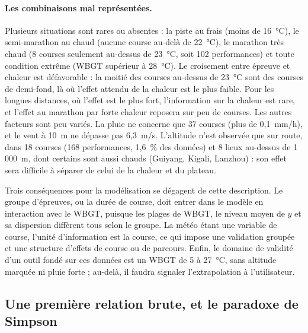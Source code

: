 \documentclass[11pt,a4paper]{article}
\begin{document}
\paragraph{Les combinaisons mal représentées.} Plusieurs situations sont rares ou absentes : la piste au frais (moins
de 16~°C), le semi-marathon au chaud (aucune course au-delà de 22~°C), le marathon très chaud (8 courses seulement
au-dessus de 23~°C, soit 102 performances) et toute condition extrême (WBGT supérieur à 28~°C). Le croisement entre
épreuve et chaleur est défavorable : la moitié des courses au-dessus de 23~°C sont des courses de demi-fond, là où
l'effet attendu de la chaleur est le plus faible. Pour les longues distances, où l'effet est le plus fort,
l'information sur la chaleur est rare, et l'effet au marathon par forte chaleur reposera sur peu de courses. Les
autres facteurs sont peu variés. La pluie ne concerne que 37 courses (plus de 0,1~mm/h), et le vent à 10~m ne dépasse
pas 6,3~m/s. L'altitude n'est observée que sur route, dans 18 courses (168 performances, 1,6~\% des données) et 8 lieux
au-dessus de 1\,000~m, dont certains sont aussi chauds (Guiyang, Kigali, Lanzhou) : son effet sera difficile à séparer
de celui de la chaleur et du plateau.

Trois conséquences pour la modélisation se dégagent de cette description. Le groupe d'épreuves, ou la durée de course,
doit entrer dans le modèle en interaction avec le WBGT, puisque les plages de WBGT, le niveau moyen de $y$ et sa
dispersion diffèrent tous selon le groupe. La météo étant une variable de course, l'unité d'information est la course,
ce qui impose une validation groupée et une structure d'effets de course ou de parcours. Enfin, le domaine de validité
d'un outil fondé sur ces données est un WBGT de 5 à 27~°C, sans altitude marquée ni pluie forte ; au-delà, il faudra
signaler l'extrapolation à l'utilisateur.

\subsection{Une première relation brute, et le paradoxe de Simpson}\label{sec:simpson}
\end{document}
